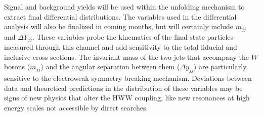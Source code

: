 Signal and background yields will be used within the unfolding mechanism to extract final differential distributions. The variables used in the differential analysis will also be finalized in coming months, but will certainly include $m_{jj}$ and $\Delta Y_{jj}$. These variables probe the kinematics of the final state particles measured through this channel and add sensitivity to the total fiducial and inclusive cross-sections. The invariant mass of the two jets that accompany the $W$ bosons ($m_{jj}$) and the angular separation between them ($\Delta y_{jj}$) are particularly sensitive to the electroweak symmetry breaking mechanism. Deviations between data and theoretical predictions in the distribution of these variables may be signs of new physics that alter the HWW coupling, like new resonances at high energy scales not accessible by direct searches.                


